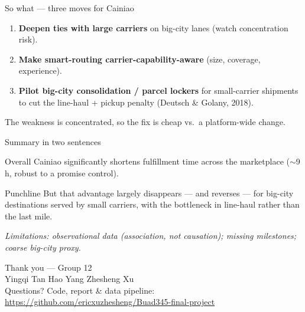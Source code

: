 \documentclass[aspectratio=169]{beamer}
\begin{document}
\begin{frame}{So what --- three moves for Cainiao}
  \begin{enumerate}
    \item \textbf{Deepen ties with large carriers} on big-city lanes (watch
          concentration risk).
    \item \textbf{Make smart-routing carrier-capability-aware} (size, coverage,
          experience).
    \item \textbf{Pilot big-city consolidation / parcel lockers} for small-carrier
          shipments to cut the line-haul + pickup penalty (Deutsch \& Golany, 2018).
  \end{enumerate}
  \vfill
  \footnotesize The weakness is concentrated, so the fix is cheap vs.\ a
  platform-wide change.
\end{frame}

\begin{frame}{Summary in two sentences}
  \begin{block}{Overall}
    Cainiao significantly shortens fulfillment time across the marketplace
    ($\sim$9\,h, robust to a promise control).
  \end{block}
  \begin{block}{Punchline}
    But that advantage largely disappears --- and reverses --- for big-city
    destinations served by small carriers, with the bottleneck in line-haul
    rather than the last mile.
  \end{block}
  \vfill
  \centering \footnotesize \emph{Limitations: observational data (association, not
  causation); missing milestones; coarse big-city proxy.}
\end{frame}

\begin{frame}[plain]
  \centering \Large Thank you --- Group 12 \\[0.5em]
  \normalsize Yingqi Tan \textbullet{} Hao Yang \textbullet{} Zhesheng Xu \\[0.5em]
  Questions?
  \vfill
  {\footnotesize Code, report \& data pipeline:\\[0.2em]
  \url{https://github.com/ericxuzhesheng/Buad345-final-project}}
\end{frame}
\end{document}
